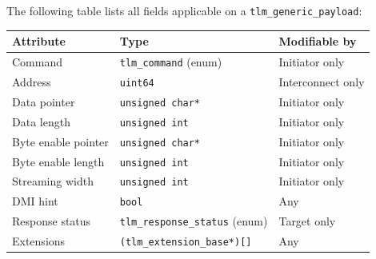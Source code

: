 \documentclass[11pt]{article}
\begin{document}
The following table lists all fields applicable on a \texttt{tlm\_generic\_payload}:

\begin{center}
\begin{tabular}{lll}
Attribute & Type & Modifiable by\\
\hline
Command & \texttt{tlm\_command} (enum) & Initiator only\\
Address & \texttt{uint64} & Interconnect only\\
Data pointer & \texttt{unsigned char*} & Initiator only\\
Data length & \texttt{unsigned int} & Initiator only\\
Byte enable pointer & \texttt{unsigned char*} & Initiator only\\
Byte enable length & \texttt{unsigned int} & Initiator only\\
Streaming width & \texttt{unsigned int} & Initiator only\\
DMI hint & \texttt{bool} & Any\\
Response status & \texttt{tlm\_response\_status} (enum) & Target only\\
Extensions & \texttt{(tlm\_extension\_base*)[]} & Any\\
\end{tabular}
\end{center}
\end{document}

